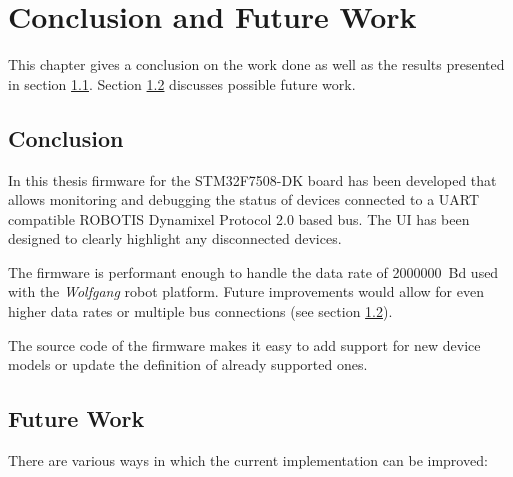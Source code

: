 \chapter{Conclusion and Future Work}
\label{conclusion-and-future-work}

This chapter gives a conclusion on the work done as well as the results presented in section
\ref{conclusion-and-future-work/conclusion}. Section \ref{conclusion-and-future-work/future-work}
discusses possible future work.

\section{Conclusion}
\label{conclusion-and-future-work/conclusion}

In this thesis firmware for the STM32F7508-DK board has been developed that allows monitoring and
debugging the status of devices connected to a UART compatible ROBOTIS Dynamixel Protocol 2.0 based
bus. The UI has been designed to clearly highlight any disconnected devices.

The firmware is performant enough to handle the data rate of \SI{2000000}{Bd} used with the
\textit{Wolfgang} robot platform. Future improvements would allow for even higher data rates or
multiple bus connections (see section \ref{conclusion-and-future-work/future-work}).

The source code of the firmware makes it easy to add support for new device models or update the
definition of already supported ones.

\section{Future Work}
\label{conclusion-and-future-work/future-work}

There are various ways in which the current implementation can be improved:

